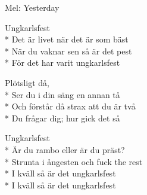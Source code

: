 \begin{SongText}[Ungkarlsfest]
    \begin{SongInfo}
        Mel: Yesterday
    \end{SongInfo}
    \begin{SongVerse}
        Ungkarlsfest\\*%
        Det är livet när det är som bäst\\*%
        När du vaknar sen så är det pest\\*%
        För det har varit ungkarlsfest
    \end{SongVerse}
    \begin{SongVerse}
        Plötsligt då,\\*%
        Ser du i din säng en annan tå\\*%
        Och förstår då strax att du är två\\*%
        Du frågar dig; hur gick det så
    \end{SongVerse}
    \begin{SongVerse}
        Ungkarlsfest\\*%
        Är du rambo eller är du präst?\\*%
        Strunta i ångesten och fuck the rest\\*%
        I kväll så är det ungkarlsfest\\*%
        I kväll så är det ungkarlsfest
    \end{SongVerse}
\end{SongText}
